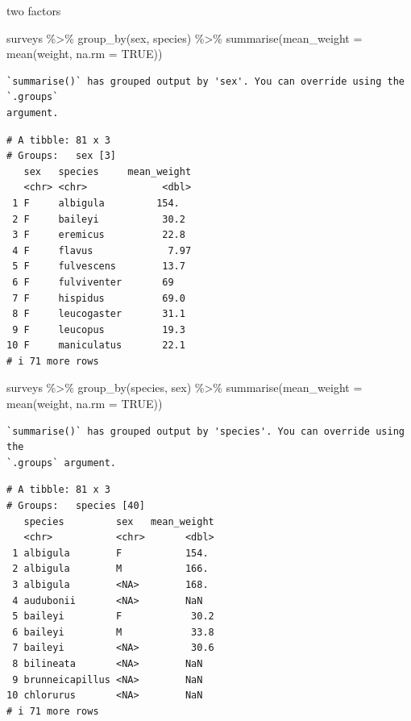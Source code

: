 \documentclass[
  letterpaper,
  DIV=11,
  numbers=noendperiod]{scrreprt}
\newenvironment{Shaded}{\begin{snugshade}}{\end{snugshade}}
\newcommand{\AttributeTok}[1]{\textcolor[rgb]{0.40,0.45,0.13}{#1}}
\newcommand{\ConstantTok}[1]{\textcolor[rgb]{0.56,0.35,0.01}{#1}}
\newcommand{\FunctionTok}[1]{\textcolor[rgb]{0.28,0.35,0.67}{#1}}
\newcommand{\NormalTok}[1]{\textcolor[rgb]{0.00,0.23,0.31}{#1}}
\newcommand{\SpecialCharTok}[1]{\textcolor[rgb]{0.37,0.37,0.37}{#1}}
\begin{document}
two factors

\begin{Shaded}
\begin{Highlighting}[]
\NormalTok{surveys }\SpecialCharTok{\%\textgreater{}\%}
  \FunctionTok{group\_by}\NormalTok{(sex, species) }\SpecialCharTok{\%\textgreater{}\%}
  \FunctionTok{summarise}\NormalTok{(}\AttributeTok{mean\_weight =} \FunctionTok{mean}\NormalTok{(weight, }\AttributeTok{na.rm =} \ConstantTok{TRUE}\NormalTok{))}
\end{Highlighting}
\end{Shaded}

\begin{verbatim}
`summarise()` has grouped output by 'sex'. You can override using the `.groups`
argument.
\end{verbatim}

\begin{verbatim}
# A tibble: 81 x 3
# Groups:   sex [3]
   sex   species     mean_weight
   <chr> <chr>             <dbl>
 1 F     albigula         154.  
 2 F     baileyi           30.2 
 3 F     eremicus          22.8 
 4 F     flavus             7.97
 5 F     fulvescens        13.7 
 6 F     fulviventer       69   
 7 F     hispidus          69.0 
 8 F     leucogaster       31.1 
 9 F     leucopus          19.3 
10 F     maniculatus       22.1 
# i 71 more rows
\end{verbatim}

\begin{Shaded}
\begin{Highlighting}[]
\NormalTok{surveys }\SpecialCharTok{\%\textgreater{}\%}
  \FunctionTok{group\_by}\NormalTok{(species, sex) }\SpecialCharTok{\%\textgreater{}\%}
  \FunctionTok{summarise}\NormalTok{(}\AttributeTok{mean\_weight =} \FunctionTok{mean}\NormalTok{(weight, }\AttributeTok{na.rm =} \ConstantTok{TRUE}\NormalTok{))}
\end{Highlighting}
\end{Shaded}

\begin{verbatim}
`summarise()` has grouped output by 'species'. You can override using the
`.groups` argument.
\end{verbatim}

\begin{verbatim}
# A tibble: 81 x 3
# Groups:   species [40]
   species         sex   mean_weight
   <chr>           <chr>       <dbl>
 1 albigula        F           154. 
 2 albigula        M           166. 
 3 albigula        <NA>        168. 
 4 audubonii       <NA>        NaN  
 5 baileyi         F            30.2
 6 baileyi         M            33.8
 7 baileyi         <NA>         30.6
 8 bilineata       <NA>        NaN  
 9 brunneicapillus <NA>        NaN  
10 chlorurus       <NA>        NaN  
# i 71 more rows
\end{verbatim}
\end{document}
